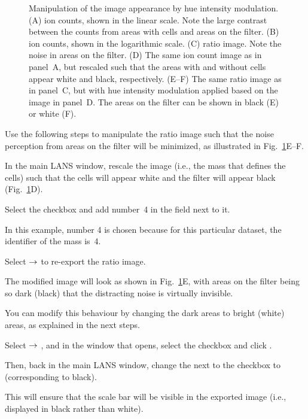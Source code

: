 \begin{figure}[!ht]
\begin{tabular}{ccc}
\end{tabular}
\caption{\label{fig:hue}%
Manipulation of the image appearance by hue intensity modulation. (A)  ion counts, shown in the linear scale. Note the large contrast between the counts from areas with cells and areas on the filter. (B)  ion counts, shown in the logarithmic scale. (C)  ratio image. Note the noise in areas on the filter. (D) The same  ion count image as in panel~A, but rescaled such that the areas with and without cells appear white and black, respectively. (E--F) The same  ratio image as in panel~C, but with hue intensity modulation applied based on the image in panel~D. The areas on the filter can be shown in black (E) or white (F).}
\end{figure}

Use the following steps to manipulate the ratio image such that the noise perception from areas on the filter will be minimized, as illustrated in Fig.~\ref{fig:hue}E--F.

\s In the main LANS window, rescale the  image (i.e., the mass that defines the cells) such that the cells will appear white and the filter will appear black (Fig.~\ref{fig:hue}D).

\s Select the  checkbox and add number~4 in the  field next to it. 

\bul In this example, number 4 is chosen because for this particular dataset, the identifier of the  mass is~4. 

\s Select  $\rightarrow$  to re-export the  ratio image.

\bul The modified image will look as shown in Fig.~\ref{fig:hue}E, with areas on the filter being so dark (black) that the distracting noise is virtually invisible.

\bul You can modify this behaviour by changing the dark areas to bright (white) areas, as explained in the next steps.

\s Select  $\rightarrow$ , and in the window that opens, select the  checkbox and click . 

\s Then, back in the main LANS window, change the  next to the  checkbox to  (corresponding to black).

\bul This will ensure that the scale bar will be visible in the exported image (i.e., displayed in black rather than white).

